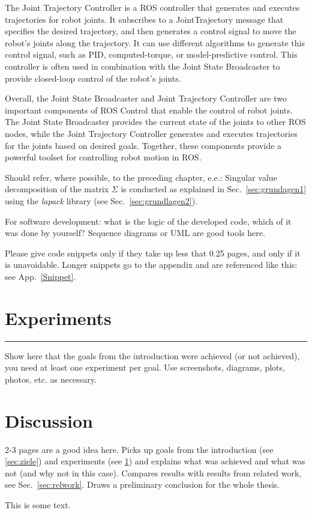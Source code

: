 \documentclass[12pt,oneside]{article}
\begin{document}
The Joint Trajectory Controller is a ROS controller that generates and executes trajectories for robot joints. It subscribes to a JointTrajectory message that specifies the desired trajectory, and then generates a control signal to move the robot's joints along the trajectory. It can use different algorithms to generate this control signal, such as PID, computed-torque, or model-predictive control. This controller is often used in combination with the Joint State Broadcaster to provide closed-loop control of the robot's joints.

Overall, the Joint State Broadcaster and Joint Trajectory Controller are two important components of ROS Control that enable the control of robot joints. The Joint State Broadcaster provides the current state of the joints to other ROS nodes, while the Joint Trajectory Controller generates and executes trajectories for the joints based on desired goals. Together, these components provide a powerful toolset for controlling robot motion in ROS. 








Should refer, where possible, to the preceding chapter, e.e.:
Singular value decomposition of the matrix $\Sigma$ is conducted as explained in Sec.~\ref{sec:grundagen1} using the \textit{lapack} library (see Sec.~\ref{sec:grundlagen2}).

For software development: what is the logic of the developed code, which of it was done by yourself? Sequence diagrams or UML are good tools here.

Please give code snippets only if they take up less that 0.25 pages, and only if it is unavoidable. Longer snippets go to the appendix and are referenced like this: see App.~\ref{Snippet}.

\section{Experiments}\label{sec:exp}



\par\noindent\rule{\textwidth}{0.4pt}
Show here that the goals from the introduction were achieved (or not achieved), you need at least one experiment per goal. Use screenshots, diagrams, plots, photos, etc. as necessary.

\section{Discussion}
2-3 pages are a good idea here. Picks up goals from the introduction (see \ref{sec:ziele}) and experiments (see \ref{sec:exp}) and explains what was achieved and what was not (and why not in this case). Compares results with results from related work, see Sec.~\ref{sec:relwork}. Draws a preliminary conclusion for the whole thesis.
\begin{tcolorbox}[label=mybox]
This is some text.
\end{tcolorbox}
\end{document}
